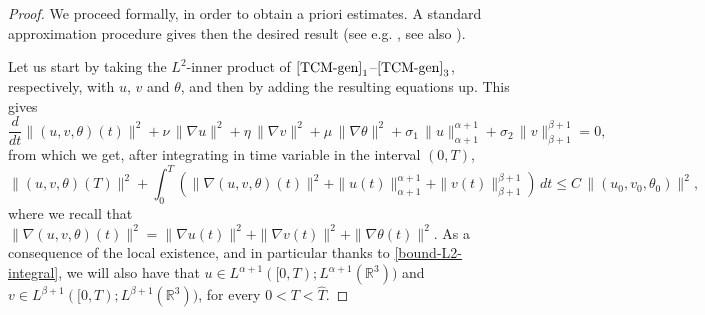\documentclass[a4paper]{article}
\begin{document}
  \begin{proof}
  We proceed formally, in order to obtain a priori estimates. A
  standard approximation procedure gives then the desired result (see
  e.g. \cite{Chae}, see also \cite{Ma-Jiang-Wan}).
  
  Let us start by taking the $L^2$-inner product of
  $\eqref{TCM-gen}_1$--$\eqref{TCM-gen}_3$,
  respectively, with $u$, $v$ and $\theta$, and then
  by adding the resulting equations up. This gives
  \begin{equation*} %
    \frac{d}{dt}\|(u,v,\theta)(t)\|^2
    +\nu\,\|\nabla u\|^2+\eta\, \|\nabla v\|^2 +\mu\,\|\nabla
    \theta\|^2 + \sigma_1\, \|u\|_{\alpha+1}^{\alpha+1}+\sigma_2 \,
    \|v\|_{\beta+1}^{\beta+1} =0,
  \end{equation*}
  from which we get, after integrating in time variable in the interval
  $(0,T)$,
  \begin{equation} \label{bound-L2-integral}
    \|(u,v,\theta)(T)\|^2 + \int_{0}^{T} \left( \|\nabla (u,v,\theta)(t)\|^2
      + \|u(t)\|_{\alpha+1}^{\alpha+1}+ \|v(t)\|_{\beta+1}^{\beta+1}
    \right) \, dt \le C\, \|(u_0,v_0,\theta_0)\|^2,
  \end{equation}
  where we recall that
%
$\|\nabla (u, v, \theta)(t)\|^2 =\|\nabla u(t)\|^2 +\|\nabla
v(t)\|^2+\|\nabla \theta(t)\|^2$.
As a consequence of the local existence, and in particular thanks to 
\eqref{bound-L2-integral}, we will also have that $u\in L^{\alpha+1}([0,T); L^{\alpha+1}(\mathbb{R}^3))$ and
$ v\in L^{\beta+1}([0,T); L^{\beta+1}(\mathbb{R}^3))$, for every $0 < T<\hat T$. 
  

\end{proof}
\end{document}
